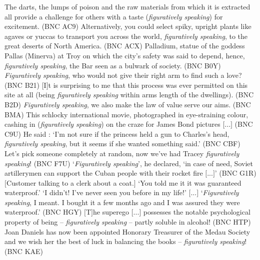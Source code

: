 \begin{exe}
\ex
\begin{xlist} 
\label{ex:figurativelyspeaking}
\ex The darts, the lumps of poison and the raw materials from which it is extracted all provide a challenge for others with a taste (\textit{figuratively speaking}) for excitement. (BNC AC9) %
\ex Alternatively, you could select spiky, upright plants like agaves or yuccas to transport you across the world, \textit{figuratively speaking}, to the great deserts of North America. (BNC ACX) %
\ex Palladium, statue of the goddess Pallas (Minerva) at Troy on which the city's safety was said to depend, hence, \textit{figuratively speaking}, the Bar seen as a bulwark of society. (BNC B0Y) %
\ex \textit{Figuratively speaking}, who would not give their right arm to find such a love? (BNC B21) %
\ex $[$I$]$t is surprising to me that this process was ever permitted on this site at all (being \textit{figuratively speaking} within arms length of the dwellings). (BNC B2D) %
\ex \textit{Figuratively speaking}, we also make the law of value serve our aims. (BNC BMA) %
\ex This schlocky international movie, photographed in eye-straining colour, cashing in (\textit{figuratively speaking}) on the craze for James Bond pictures  $[$...$]$  (BNC C9U) %
\ex He said : `I'm not sure if the princess held a gun to Charles's head, \textit{figuratively speaking}, but it seems if she wanted something said.' (BNC CBF) %
\ex Let's pick someone completely at random, now we've had Tracey \textit{figuratively speaking}! (BNC F7U) %
\ex `\textit{Figuratively speaking}', he declared, `in case of need, Soviet artillerymen can support the Cuban people with their rocket fire $[$...$]$' (BNC G1R) %
\ex $[$Customer talking to a clerk about a coat.$]$ `You told me it it was guaranteed waterproof.' `I didn't! I've never seen you before in my life!'  $[$...$]$  `\textit{Figuratively speaking}, I meant. I bought it a few months ago and I was assured they were waterproof.' (BNC HGY) %
\ex $[$T$]$he superego  $[$...$]$  possesses the notable psychological property of being -- \textit{figuratively speaking} -- partly soluble in alcohol! (BNC HTP) %
\ex Joan Daniels has now been appointed Honorary Treasurer of the Medau Society and we wish her the best of luck in balancing the books -- \textit{figuratively speaking}! (BNC KAE) %
\end{xlist}
\end{exe}

